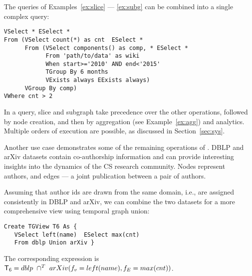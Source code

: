 The queries of Examples~\ref{ex:slice} --- \ref{ex:subg} can be
combined into a single complex query:

\begin{small}
\begin{verbatim}
VSelect * ESelect *
From (VSelect count(*) as cnt  ESelect *
      From (VSelect components() as comp, * ESelect *
            From 'path/to/data' as wiki
            When start>='2010' AND end<'2015' 
            TGroup By 6 months
            VExists always EExists always)
      VGroup By comp)
VWhere cnt > 2 
\end{verbatim}
\vspace{-0.1cm}
\end{small}

In a \ql query, slice and subgraph take precedence over the other
operations, followed by node creation, and then by aggregation (see
Example~\ref{ex:agg}) and analytics.  Multiple orders of execution are
possible, as discussed in Section~\ref{sec:sys}.


Another use case demonstrates some of the remaining operations of
\tga.  DBLP and arXiv datasets contain co-authorship information and
can provide interesting insights into the dynamics of the CS research
community.  Nodes represent authors, and edges --- a joint publication
between a pair of authors.

\begin{example}
\label{ex:union}
\vspace{-0.1cm}

Assuming that author ids are drawn from the same domain, i.e., are
assigned consistently in DBLP and arXiv, we can combine the two
datasets for a more comprehensive view using temporal graph union:

\begin{small}
\begin{verbatim}
Create TGView T6 As {
   VSelect left(name)  ESelect max(cnt)
   From dblp Union arXiv }
\end{verbatim}
\vspace{-0.1cm}
\end{small}

The corresponding \tga expression is\\$\mathsf{T}_6 = dblp~\cap^T~arXiv(f_v=left(name),f_E=max(cnt))$.
\vspace{-0.1cm}
\end{example}

